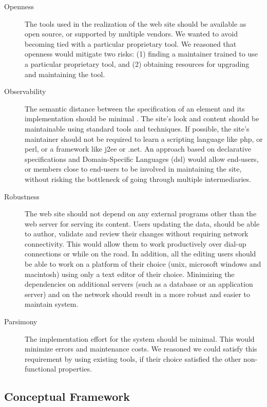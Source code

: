 \documentclass{elsart}
\begin{document}
\begin{description}
\item[Openness] The tools used in the realization of the web site
should be available as open source, or supported by multiple vendors.
We wanted to avoid becoming tied with a particular proprietary
tool.
We reasoned that openness would mitigate two risks:
(1) finding a maintainer trained to use a particular proprietary tool,
and (2) obtaining resources for upgrading and maintaining the tool.

\item[Observability]
The semantic distance between
the specification of an element and its implementation 
should be minimal \cite{SG97}.
The site's look and content should be maintainable
using standard tools and techniques.
If possible, the site's maintainer should not be required to
learn a scripting language like {\sc php}, or {\sc perl}, or
a framework like {\sc j2ee} or {\sc .net}.
An approach based on declarative specifications \cite{FFLS00} and
Domain-Specific Languages ({\sc dsl}) \cite{DKV00,Spi00b} would allow end-users, or members
close to end-users to be involved in maintaining the site,
without risking the bottleneck of going through
multiple intermediaries.

\item[Robustness] The web site should not depend on
any external programs other than the web server for serving
its content.
Users updating the data, should be able to author, validate and 
review their changes without requiring network connectivity.
This would allow them to work productively over dial-up connections
or while on the road. In addition, all the editing users should be able 
to work on a platform of their choice ({\sc unix}, {\sc microsoft windows} and {\sc macintosh}) 
using only a text editor of their choice.
Minimizing the dependencies on additional servers (such as a
database or an application server) and on the network
should result in a more robust and easier to maintain system.

\item[Parsimony] The implementation effort for
the system should be minimal.
This would minimize errors and maintenance costs.
We reasoned we could satisfy this requirement by
using existing tools, if their choice satisfied the
other non-functional properties.
\end{description} 

\subsection{Conceptual Framework}
\end{document}
